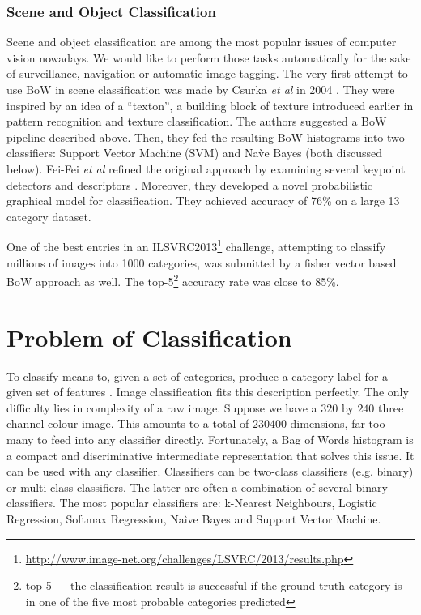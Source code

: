 		\subsubsection{Scene and Object Classification}
		Scene and object classification are among the most popular issues of computer vision nowadays. We would like to perform those tasks automatically for the sake of surveillance, navigation or automatic image tagging. The very first attempt to use BoW in scene classification was made by Csurka \textit{et al} in 2004 \cite{csurka2004visual}. They were inspired by an idea of a ``texton'', a building block of texture introduced earlier in pattern recognition and texture classification. The authors suggested a BoW pipeline described above. Then, they fed the resulting BoW histograms into two classifiers: Support Vector Machine (SVM) and Na\`ve Bayes (both discussed below). Fei-Fei \emph{et al} refined the original approach by examining several keypoint detectors and descriptors \cite{fei2005bayesian}. Moreover, they developed a novel probabilistic graphical model for classification. They achieved accuracy of 76\% on a large 13 category dataset. 
		
		One of the best entries in an ILSVRC2013\footnote{\url{http://www.image-net.org/challenges/LSVRC/2013/results.php}} challenge, attempting to classify millions of images into 1000 categories, was submitted by a fisher vector based BoW approach as well. The top-5\footnote{top-5 --- the classification result is successful if the ground-truth category is in one of the five most probable categories predicted} accuracy rate was close to 85\%.
		
\section{Problem of Classification}

	To classify means to, given a set of categories, produce a category label for a given set of features \cite{ponce2011cv}. Image classification fits this description perfectly. The only difficulty lies in complexity of a raw image. Suppose we have a $320$ by $240$ three channel colour image. This amounts to a total of $230400$ dimensions, far too many to feed into any classifier directly. Fortunately, a Bag of Words histogram is a compact and discriminative intermediate representation that solves this issue. It can be used with any classifier. Classifiers can be two-class classifiers (e.g. binary) or multi-class classifiers. The latter are often a combination of several binary classifiers. The most popular classifiers are: k-Nearest Neighbours, Logistic Regression, Softmax Regression, Na\`ive Bayes and Support Vector Machine.
	
